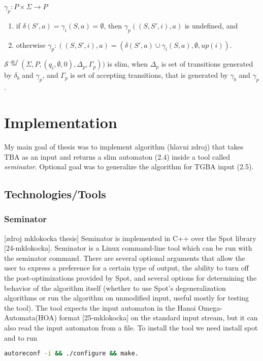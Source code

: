 \documentclass[
	digital
nolof, nolot
]{fithesis3}
\newcommand{\cS}{\mathcal{S}}
\newcommand{\eqdef}{\overset{def}{=}}
\begin{document}
		
				$\gamma_{p}: P \times \Sigma \rightarrow P$
			\begin{enumerate}
				\item if $\delta(S',a)=\gamma_{i}(S, a)=\emptyset$, then $ \gamma_{p}((S,S',i),a)$ is undefined, and
				\item otherwise $\gamma_p \colon ((S,S',i),a) = (\delta(S',a)\cup \gamma_{i}(S, a), \emptyset, up(i))$.
			\end{enumerate}
			$\cS\eqdef(\Sigma, P, (q_i,\emptyset,0), \Delta_p,\Gamma_p))$ is slim, when $\Delta_p$ is set of transitions generated by $\delta_b$ and $\gamma_p$, and $\Gamma_p$ is set of accepting transitions, that is generated by $\gamma_b$ and $\gamma_p$.
			
	\chapter{Implementation}
		My main goal of thesis was to implement algorithm (hlavni zdroj) that takes TBA as an input and returns a slim automaton (2.4) inside a tool called \emph{seminator}. Optional goal was to generalize the algorithm for TGBA input (2.5).
		
		
		
		
		\section{Technologies/Tools}
		\subsection{Seminator} [zdroj mklokocka thesis] Seminator is implemented in C++ over the Spot library [24-mklokocka].
		Seminator is a Linux command-line tool which can be run with the seminator command.
		There are several optional arguments that allow the user to express a preference for a certain type of output, the ability to turn off the post-optimizations provided by Spot, and several options for determining the behavior of the algorithm itself (whether to use Spot’s degeneralization algorithms or run the algorithm on unmodified input, useful mostly for testing the tool).
		The tool expects the input automaton in the Hanoi Omega-Automata(HOA) format [25-mklokocka] on the standard input stream, but it can also read the input automaton from a file.
		To install the tool we need install spot and to run 

		
		
		
		\begin{lstlisting}[language=bash]
autoreconf -i && ./configure && make.
		\end{lstlisting}
\end{document}
